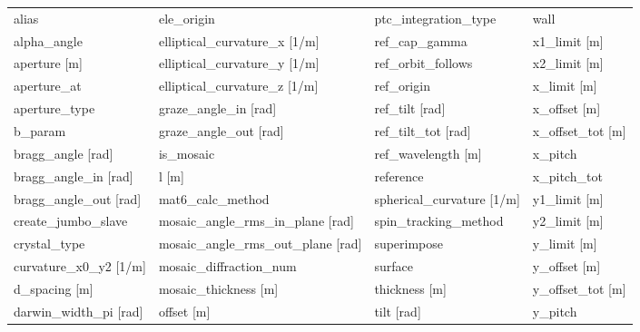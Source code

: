  \begin{tabular}{llll} \toprule
alias                            & ele_origin                       & ptc_integration_type             & wall                             \\
alpha_angle                      & elliptical_curvature_x [1/m]     & ref_cap_gamma                    & x1_limit [m]                     \\
aperture [m]                     & elliptical_curvature_y [1/m]     & ref_orbit_follows                & x2_limit [m]                     \\
aperture_at                      & elliptical_curvature_z [1/m]     & ref_origin                       & x_limit [m]                      \\
aperture_type                    & graze_angle_in [rad]             & ref_tilt [rad]                   & x_offset [m]                     \\
b_param                          & graze_angle_out [rad]            & ref_tilt_tot [rad]               & x_offset_tot [m]                 \\
bragg_angle [rad]                & is_mosaic                        & ref_wavelength [m]               & x_pitch                          \\
bragg_angle_in [rad]             & l [m]                            & reference                        & x_pitch_tot                      \\
bragg_angle_out [rad]            & mat6_calc_method                 & spherical_curvature [1/m]        & y1_limit [m]                     \\
create_jumbo_slave               & mosaic_angle_rms_in_plane [rad]  & spin_tracking_method             & y2_limit [m]                     \\
crystal_type                     & mosaic_angle_rms_out_plane [rad] & superimpose                      & y_limit [m]                      \\
curvature_x0_y2 [1/m]            & mosaic_diffraction_num           & surface                          & y_offset [m]                     \\
d_spacing [m]                    & mosaic_thickness [m]             & thickness [m]                    & y_offset_tot [m]                 \\
darwin_width_pi [rad]            & offset [m]                       & tilt [rad]                       & y_pitch                          \\

\end{tabular}
